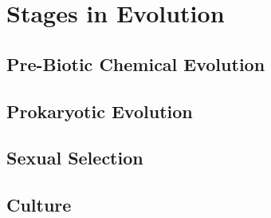 \documentclass[10pt,titlepage]{article}
\begin{document}
  \section{Stages in Evolution}

  \subsection{Pre-Biotic Chemical Evolution}

  \subsection{Prokaryotic Evolution}

  \subsection{Sexual Selection}

  \subsection{Culture}



{}








\end{document}
